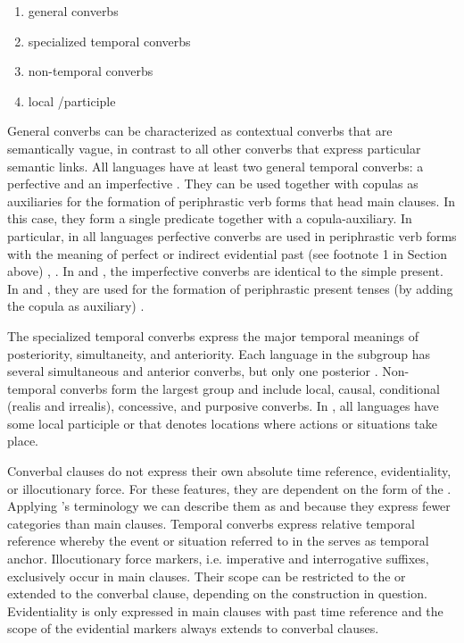 \documentclass[output=paper]{LSP/langsci}
\begin{document}
\begin{enumerate}
\item general converbs 
\item specialized temporal converbs 
\item non-temporal converbs
\item local /participle
\end{enumerate}

General converbs can be characterized as contextual converbs that are semantically vague, in contrast to all other converbs that express particular semantic links. All  languages have at least two general temporal converbs: a perfective  and an imperfective . They can be used together with copulas as auxiliaries for the formation of periphrastic verb forms that head main clauses. In this case, they form a single predicate together with a copula-auxiliary. In particular, in all  languages perfective converbs are used in periphrastic verb forms with the meaning of perfect or indirect evidential past (see footnote 1 in Section  above) , . In  and ,  the imperfective converbs are identical to the simple present. In  and , they are used for the formation of periphrastic present tenses (by adding the copula as  auxiliary) .

The specialized temporal converbs express the major temporal meanings of posteriority, simultaneity, and anteriority. Each language in the  subgroup has several simultaneous and anterior converbs, but only one posterior . Non-temporal converbs form the largest group and include local, causal, conditional (realis and irrealis), concessive, and purposive converbs. In , all  languages have some local participle or  that denotes locations where actions or situations take place.

Converbal clauses do not express their own absolute time reference, evidentiality, or illocutionary force. For these features, they are dependent on the form of the . Applying \citeauthor{Bickel.2010}'s \citeyear{Bickel.2010} terminology we can describe them as  and  because they express fewer categories than main clauses. Temporal converbs express relative temporal reference whereby the event or situation referred to in the  serves as temporal anchor. Illocutionary force markers, i.e. imperative and interrogative suffixes, exclusively occur in main clauses. Their scope can be restricted to the  or extended to the converbal clause, depending on the construction in question. Evidentiality is only expressed in main clauses with past time reference and the scope of the evidential markers always extends to converbal clauses.
\end{document}
